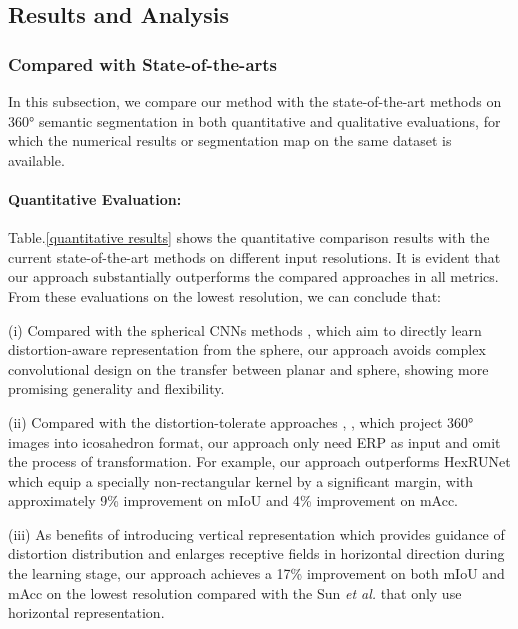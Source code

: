 \documentclass[runningheads]{llncs}
\begin{document}
	
	\subsection{Results and Analysis} \label{results}
	
	
	\subsubsection{Compared with State-of-the-arts}
	
	In this subsection, we compare our method with the state-of-the-art methods on 360° semantic segmentation in both quantitative and qualitative evaluations, for which the numerical results or segmentation map on the same dataset is available.
	
	\paragraph{Quantitative Evaluation:} Table.\ref{quantitative results} shows the quantitative comparison results with the current state-of-the-art methods on different input resolutions.
	It is evident that our approach substantially outperforms the compared approaches in all metrics.
	From these evaluations on the lowest resolution, we can conclude that:
	
	(i) Compared with the spherical CNNs methods \cite{cohen2019gauge}, \cite{esteves2020spin} \cite{jiang2018spherical} which aim to directly learn distortion-aware representation from the sphere, our approach avoids complex convolutional design on the transfer between planar and sphere, showing more promising generality and flexibility.
	
	(ii) Compared with the distortion-tolerate approaches \cite{eder2020tangent}, \cite{zhang2019orientation}, which project 360° images into icosahedron format, our approach only need ERP as input and omit the process of transformation.
	For example, our approach outperforms HexRUNet \cite{zhang2019orientation} which equip a specially non-rectangular kernel by a significant margin, with approximately 9\% improvement on mIoU and 4\% improvement on mAcc.
	
	(iii) As benefits of introducing vertical representation which provides guidance of distortion distribution and enlarges receptive fields in horizontal direction during the learning stage, our approach achieves a 17\% improvement on both mIoU and mAcc on the lowest resolution compared with the Sun \emph{et al.} \cite{sun2021hohonet} that only use horizontal representation.
	
\end{document}
